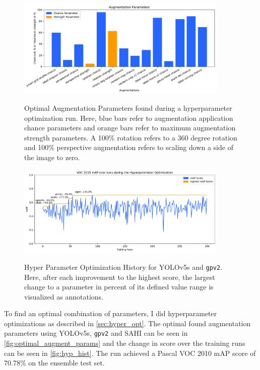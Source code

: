 \documentclass[10pt]{book}
\newcommand{\figureref}[1]{\autoref{#1}}
\begin{document}
\begin{figure}
  \caption{Optimal Augmentation Parameters found during a hyperparameter optimization run. Here, blue bars refer to augmentation application chance parameters and orange bars refer to maximum augmentation strength parameters. A 100\% rotation refers to a 360 degree rotation and 100\% perspective augmentation refers to scaling down a side of the image to zero.}
  \includegraphics[width=0.9\textwidth]{plot/best_hyp_run_params}
  \label{fig:optimal_augment_params} 
\end{figure} %

\begin{figure}
  \caption{Hyper Parameter Optimization History for \ac{YOLO}v5s and \texttt{gpv2}. Here, after each improvement to the highest score, the largest change to a parameter in percent of its defined value range is visualized as annotations.}
  \includegraphics[width=0.9\textwidth]{image/hyp-param-search-yolov5s-sahi-rc-fix-history}
  \label{fig:hyp_hist}
\end{figure}


To find an optimal combination of parameters, I did hyperparameter optimizations as described in \autoref{sec:hyper_opt}. The optimal found augmentation parameters using \ac{YOLO}v5s, \texttt{gpv2} and \ac{SAHI} can be seen in \figureref{fig:optimal_augment_params} and the change in score over the training runs can be seen in \figureref{fig:hyp_hist}. 
The run achieved a Pascal VOC 2010 \ac{mAP} score of 70.78\% on the ensemble test set.
\end{document}
